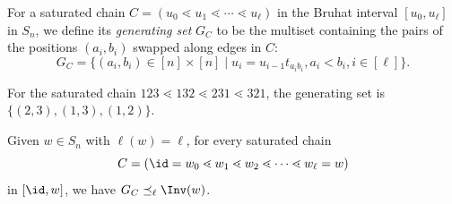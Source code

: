\begin{defi}
    For a saturated chain $C = (u_0 \lessdot u_1\lessdot\cdots \lessdot u_{\ell})$ in the Bruhat interval $[u_0,u_{\ell}]$ in $S_n$,
    we define its \emph{generating set} $G_C$ to be the multiset containing the pairs of the positions $(a_i, b_i)$ swapped along edges in $C$:
    \[G_C = \{(a_i,b_i)\in [n] \times [n]\mid u_{i}=u_{i-1}t_{a_ib_i}, a_i < b_i, i\in[\ell]\}.\]
\end{defi}
\begin{exam}\label{ex:Gc}
    For the saturated chain $123 \lessdot 132 \lessdot 231 \lessdot 321$, the generating set is $\{(2,3), (1,3), (1,2)\}$.
\end{exam}

\begin{lemma}\label{lemma:chainorder}
    Given $w\in S_n$ with $\ell(w) = \ell$, for every saturated chain \[C=(\id=w_0\lessdot w_1\lessdot w_2\lessdot \dots \lessdot w_{\ell} =w)\] in $[\id, w]$, we have
    $G_C\preceq_{\ell} \Inv(w)$.
\end{lemma}


